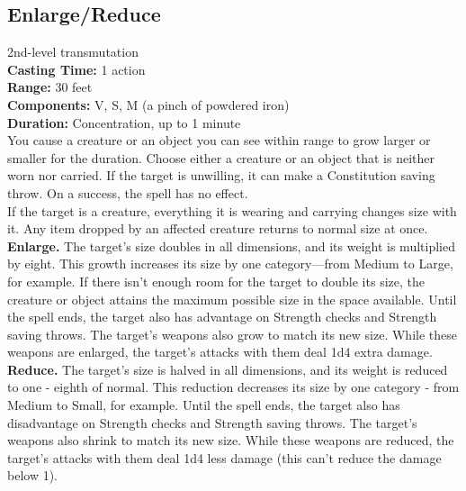 \documentclass[11pt, A4paper, english]{article}
\begin{document}
		\subsection{Enlarge/Reduce}
2nd-level transmutation \\
\textbf{Casting Time:} 1 action \\
\textbf{Range:} 30 feet \\
\textbf{Components:} V, S, M (a pinch of powdered iron) \\
\textbf{Duration:} Concentration, up to 1 minute \\
You cause a creature or an object you can see within range to grow larger or smaller for the duration. Choose either a creature or an object that is neither worn nor carried. If the target is unwilling, it can make a Constitution saving throw. On a success, the spell has no effect. \\
If the target is a creature, everything it is wearing and carrying changes size with it. Any item dropped by an affected creature returns to normal size at once. \\
\textbf{Enlarge.} The target’s size doubles in all dimensions, and its weight is multiplied by eight. This growth increases its size by one category—from Medium to Large, for example. If there isn't enough room for the target to double its size, the creature or object attains the maximum possible size in the space available. Until the spell ends, the target also has advantage on Strength checks and Strength saving throws. The target's weapons also grow to match its new size. While these weapons are enlarged, the target’s attacks with them deal 1d4 extra damage. \\
\textbf{Reduce.} The target's size is halved in all dimensions, and its weight is reduced to one - eighth of normal. This reduction decreases its size by one category - from Medium to Small, for example. Until the spell ends, the target also has disadvantage on Strength checks and Strength saving throws. The target’s weapons also shrink to match its new size. While these weapons are reduced, the target’s attacks with them deal 1d4 less damage (this can’t reduce the damage below 1).
\end{document}
